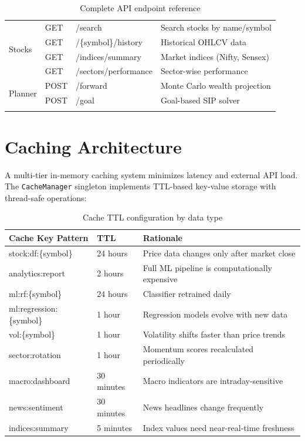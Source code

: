 \documentclass[12pt, a4paper, oneside]{report}
\begin{document}
\begin{longtable}{@{}l l l p{6cm}@{}}
\midrule
\multirow{4}{*}{Stocks} & GET & /search & Search stocks by name/symbol \\
& GET & /\{symbol\}/history & Historical OHLCV data \\
& GET & /indices/summary & Market indices (Nifty, Sensex) \\
& GET & /sectors/performance & Sector-wise performance \\
\midrule
\multirow{2}{*}{Planner} & POST & /forward & Monte Carlo wealth projection \\
& POST & /goal & Goal-based SIP solver \\
\bottomrule
\caption{Complete API endpoint reference}
\label{tab:api_endpoints}
\end{longtable}

\section{Caching Architecture}
\label{sec:caching}

A multi-tier in-memory caching system minimizes latency and external API load. The \texttt{CacheManager} singleton implements TTL-based key-value storage with thread-safe operations:

\begin{table}[H]
\centering
\caption{Cache TTL configuration by data type}
\label{tab:cache_ttl}
\begin{tabularx}{\textwidth}{@{}l l X@{}}
\toprule
\textbf{Cache Key Pattern} & \textbf{TTL} & \textbf{Rationale} \\
\midrule
stock:df:\{symbol\} & 24 hours & Price data changes only after market close \\
analytics:report & 2 hours & Full ML pipeline is computationally expensive \\
ml:rf:\{symbol\} & 24 hours & Classifier retrained daily \\
ml:regression:\{symbol\} & 1 hour & Regression models evolve with new data \\
vol:\{symbol\} & 1 hour & Volatility shifts faster than price trends \\
sector:rotation & 1 hour & Momentum scores recalculated periodically \\
macro:dashboard & 30 minutes & Macro indicators are intraday-sensitive \\
news:sentiment & 30 minutes & News headlines change frequently \\
indices:summary & 5 minutes & Index values need near-real-time freshness \\
\bottomrule
\end{tabularx}
\end{table}
\end{document}
